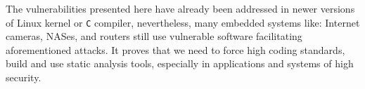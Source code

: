 \documentclass[12pt, a4paper, pdflatex]{article}
\begin{document}
The vulnerabilities presented here have already been addressed in newer versions of Linux kernel or \texttt{C} compiler, nevertheless, many embedded systems like: Internet cameras, NASes, and routers still use vulnerable software facilitating aforementioned attacks. It proves that we need to force high coding standards, build and use static analysis tools, especially in applications and systems of high security.

\vfill



\newpage
\begin{appendices}

\end{appendices}
\end{document}

